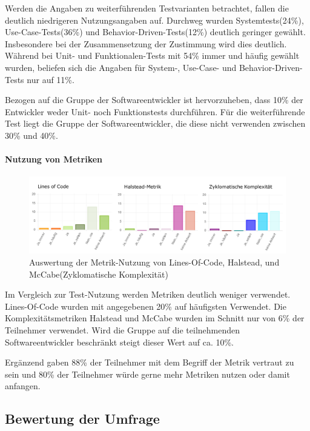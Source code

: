 Werden die Angaben zu weiterführenden Testvarianten betrachtet, fallen die deutlich niedrigeren Nutzungsangaben auf. Durchweg wurden Systemtests(24\%), Use-Case-Tests(36\%) und Behavior-Driven-Tests(12\%) deutlich geringer gewählt. Insbesondere bei der Zusammensetzung der Zustimmung wird dies deutlich. Während bei Unit- und Funktionalen-Tests mit 54\% \glqq immer\grqq{} und \glqq häufig\grqq{} gewählt wurden, beliefen sich die Angaben für System-, Use-Case- und Behavior-Driven-Tests nur auf 11\%.

Bezogen auf die Gruppe der Softwareentwickler ist hervorzuheben, dass 10\% der Entwickler weder Unit- noch Funktionstests durchführen. Für die weiterführende Test liegt die Gruppe der Softwareentwickler, die diese nicht verwenden zwischen 30\% und 40\%.

\paragraph{Nutzung von Metriken}

\begin{figure}[htbp]
  \includegraphics[width=\textwidth, height=\textheight, keepaspectratio]
    {resources/survey-test-usage-metric.pdf}
  \caption{Auswertung der Metrik-Nutzung von Lines-Of-Code, Halstead, und McCabe(Zyklomatische Komplexität)}
\end{figure}

Im Vergleich zur Test-Nutzung werden Metriken deutlich weniger verwendet. Lines-Of-Code wurden mit angegebenen 20\% auf häufigsten Verwendet. Die Komplexitätsmetriken Halstead und McCabe wurden im Schnitt nur von 6\% der Teilnehmer verwendet. Wird die Gruppe auf die teilnehmenden Softwareentwickler beschränkt steigt dieser Wert auf ca. 10\%.

Ergänzend gaben 88\% der Teilnehmer mit dem Begriff der Metrik vertraut zu sein und 80\% der Teilnehmer würde gerne mehr Metriken nutzen oder damit anfangen.

\subsection{Bewertung der Umfrage}

